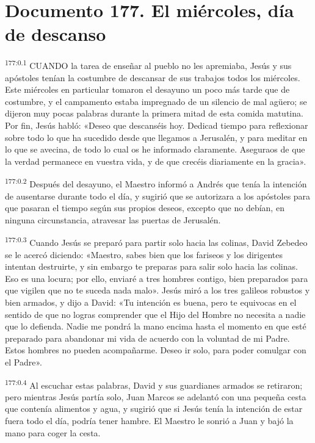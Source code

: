 \chapter{Documento 177. El miércoles, día de descanso}
\par 
\textsuperscript{177:0.1} CUANDO la tarea de enseñar al pueblo no les apremiaba, Jesús y sus apóstoles tenían la costumbre de descansar de sus trabajos todos los miércoles. Este miércoles en particular tomaron el desayuno un poco más tarde que de costumbre, y el campamento estaba impregnado de un silencio de mal ag\"uero; se dijeron muy pocas palabras durante la primera mitad de esta comida matutina. Por fin, Jesús habló: «Deseo que descanséis hoy. Dedicad tiempo para reflexionar sobre todo lo que ha sucedido desde que llegamos a Jerusalén, y para meditar en lo que se avecina, de todo lo cual os he informado claramente. Aseguraos de que la verdad permanece en vuestra vida, y de que crecéis diariamente en la gracia».

\par 
\textsuperscript{177:0.2} Después del desayuno, el Maestro informó a Andrés que tenía la intención de ausentarse durante todo el día, y sugirió que se autorizara a los apóstoles para que pasaran el tiempo según sus propios deseos, excepto que no debían, en ninguna circunstancia, atravesar las puertas de Jerusalén.

\par 
\textsuperscript{177:0.3} Cuando Jesús se preparó para partir solo hacia las colinas, David Zebedeo se le acercó diciendo: «Maestro, sabes bien que los fariseos y los dirigentes intentan destruirte, y sin embargo te preparas para salir solo hacia las colinas. Eso es una locura; por ello, enviaré a tres hombres contigo, bien preparados para que vigilen que no te suceda nada malo». Jesús miró a los tres galileos robustos y bien armados, y dijo a David: «Tu intención es buena, pero te equivocas en el sentido de que no logras comprender que el Hijo del Hombre no necesita a nadie que lo defienda. Nadie me pondrá la mano encima hasta el momento en que esté preparado para abandonar mi vida de acuerdo con la voluntad de mi Padre. Estos hombres no pueden acompañarme. Deseo ir solo, para poder comulgar con el Padre».

\par 
\textsuperscript{177:0.4} Al escuchar estas palabras, David y sus guardianes armados se retiraron; pero mientras Jesús partía solo, Juan Marcos se adelantó con una pequeña cesta que contenía alimentos y agua, y sugirió que si Jesús tenía la intención de estar fuera todo el día, podría tener hambre. El Maestro le sonrió a Juan y bajó la mano para coger la cesta.

